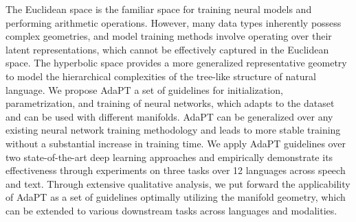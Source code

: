 The Euclidean space is the familiar space for training neural models and performing arithmetic operations. However, many data types inherently possess complex geometries, and model training methods involve operating over their latent representations, which cannot be effectively captured in the Euclidean space. The hyperbolic space provides a more generalized representative geometry to model the hierarchical complexities of the tree-like structure of natural language. We propose AdaPT a set of guidelines for initialization, parametrization, and training of neural networks, which adapts to the dataset and can be used with different manifolds.  AdaPT can be generalized over any existing neural network training methodology and leads to more stable training without a substantial increase in training time. We apply AdaPT guidelines over two state-of-the-art deep learning approaches and empirically demonstrate its effectiveness through experiments on three tasks over 12 languages across speech and text. Through extensive qualitative analysis, we put forward the applicability of AdaPT as a set of guidelines optimally utilizing the manifold geometry, which can be extended to various downstream tasks across languages and modalities.